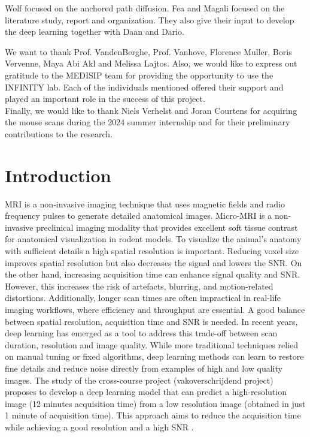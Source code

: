 \documentclass[twocolumn]{article}
\begin{document}
Wolf focused on the anchored path diffusion. Fea and Magali focused on the literature study, report and organization. 
They also give their input to develop the deep learning together with Daan and Dario.

We want to thank Prof. VandenBerghe, Prof. Vanhove, Florence Muller, Boris Vervenne, Maya Abi Akl and Melissa Lajtos. 
Also, we would like to express out gratitude to the MEDISIP team for providing the opportunity to use the INFINITY lab. 
Each of the individuals mentioned offered their support and played an important role in the success of this project. \\

Finally, we would like to thank Niels Verhelst and Joran Courtens for acquiring the mouse scans during the 2024 summer internship and for their preliminary contributions to the research.



\newpage
\section{Introduction}

MRI is a non‐invasive imaging technique that uses magnetic fields and radio frequency pulses to generate detailed anatomical images. 
Micro-MRI is a non-invasive preclinical imaging modality that provides excellent soft tissue contrast for anatomical visualization in rodent models. 
To visualize the animal's anatomy with sufficient details a high spatial resolution is important. Reducing voxel size improves spatial resolution but also decreases the signal and lowers the SNR. 
On the other hand, increasing acquisition time can enhance signal quality and SNR. However, this increases the risk of artefacts, blurring, and motion-related distortions. 
Additionally, longer scan times are often impractical in real-life imaging workflows, where efficiency and throughput are essential. 
A good balance between spatial resolution, acquisition time and SNR is needed.
In recent years, deep learning has emerged as a tool to address this trade-off between scan duration, resolution and image quality. 
While more traditional techniques relied on manual tuning or fixed algorithms, deep learning methods can learn to restore fine details and reduce noise directly from examples of high and low quality images. 
The study of the cross-course project (vakoverschrijdend project) proposes to develop a deep learning model that can predict a high-resolution image (12 minutes acquisition time) from a low resolution image (obtained in just 1 minute of acquisition time). 
This approach aims to reduce the acquisition time while achieving a good resolution and a high SNR \cite{brown2014magnetic}. 
\end{document}
